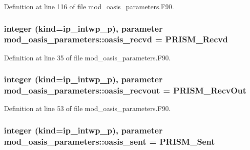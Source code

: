 Definition at line 116 of file mod\+\_\+oasis\+\_\+parameters.\+F90.

\hypertarget{classmod__oasis__parameters_a50fc92036d81ca0ea23918e1feddfe75}{
\subsubsection[{oasis\+\_\+recvd}]{\setlength{\rightskip}{0pt plus 5cm}integer (kind=ip\+\_\+intwp\+\_\+p), parameter mod\+\_\+oasis\+\_\+parameters\+::oasis\+\_\+recvd = P\+R\+I\+S\+M\+\_\+\+Recvd}}\label{classmod__oasis__parameters_a50fc92036d81ca0ea23918e1feddfe75}


Definition at line 35 of file mod\+\_\+oasis\+\_\+parameters.\+F90.

\hypertarget{classmod__oasis__parameters_ac7406e7f558491599acfbb6f4628f811}{
\subsubsection[{oasis\+\_\+recvout}]{\setlength{\rightskip}{0pt plus 5cm}integer (kind=ip\+\_\+intwp\+\_\+p), parameter mod\+\_\+oasis\+\_\+parameters\+::oasis\+\_\+recvout = P\+R\+I\+S\+M\+\_\+\+Recv\+Out}}\label{classmod__oasis__parameters_ac7406e7f558491599acfbb6f4628f811}


Definition at line 53 of file mod\+\_\+oasis\+\_\+parameters.\+F90.

\hypertarget{classmod__oasis__parameters_af739945ec2da833423cdc6e220e1c847}{
\subsubsection[{oasis\+\_\+sent}]{\setlength{\rightskip}{0pt plus 5cm}integer (kind=ip\+\_\+intwp\+\_\+p), parameter mod\+\_\+oasis\+\_\+parameters\+::oasis\+\_\+sent = P\+R\+I\+S\+M\+\_\+\+Sent}}\label{classmod__oasis__parameters_af739945ec2da833423cdc6e220e1c847}


